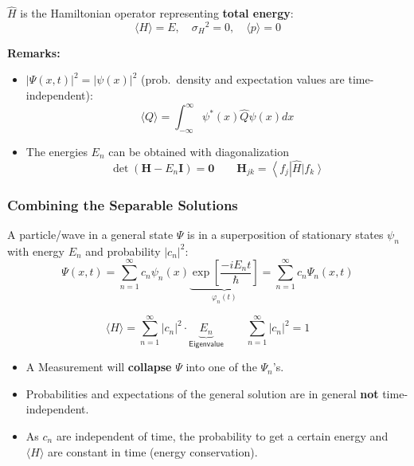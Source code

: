 $\widehat{H}$ is the Hamiltonian operator representing \textbf{total energy}:
\noindent\begin{equation*}
    \langle H\rangle = E,\quad{\sigma_H}^2 = 0, \quad \langle p\rangle = 0
\end{equation*}

\newpar{}

\textbf{Remarks:}
\begin{itemize}
    \item $|\Psi(x,t)|^2 = |\psi(x)|^2$ (prob.\ density and expectation values are time-independent):
          \noindent\begin{equation*}
              \langle Q\rangle=\int_{-\infty}^\infty\psi^*(x)\widehat{Q}\psi(x)dx
          \end{equation*}
    \item The energies $E_n$ can be obtained with diagonalization
          \noindent\begin{equation*}
              \det\left(\mathbf{H}-E_n \mathbf{I}\right) = \mathbf{0} \qquad \mathbf{H}_{jk} = \left\langle f_j\right|\widehat{H}\left|f_k \right\rangle
          \end{equation*}
\end{itemize}

\subsubsection{Combining the Separable Solutions}
A particle/wave in a general state $\Psi$ is in a superposition of stationary states $\psi_n$ with energy $E_n$ and probability $|c_n|^2$:
\noindent\begin{equation*}
    \Psi(x,t) =\sum_{n=1}^\infty c_n\psi_n(x) \underbrace{\exp\left[\frac{-iE_n t}{\hbar}\right]}_{\varphi_n(t)}=\sum_{n=1}^\infty c_n\Psi_n(x,t)
\end{equation*}

\noindent\begin{equation*}
    \langle H\rangle=\sum_{n=1}^\infty|c_n|^2\cdot \underbrace{E_n}_{\textsf{Eigenvalue}} \qquad \sum_{n=1}^\infty|c_n|^2 =1
\end{equation*}

\begin{itemize}
    \item A Measurement will \textbf{collapse} $\Psi$ into one of the $\Psi_n$'s.
    \item Probabilities and expectations of the general solution are in general \textbf{not} time-independent.
    \item As $c_n$ are independent of time, the probability to get a certain energy and $\langle H\rangle$ are constant in time (energy conservation).
\end{itemize}

